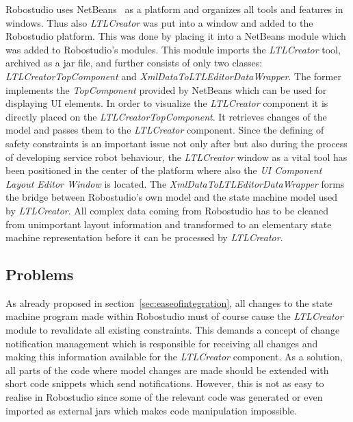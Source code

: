 Robostudio uses NetBeans~\cite{netbeans} as a platform and organizes all tools and features in windows. Thus also \emph{LTLCreator} was put into a window and added to the Robostudio platform. This was done by placing it into a NetBeans module which was added to Robostudio's modules. This module imports the \emph{LTLCreator} tool, archived as a jar file, and further consists of only two classes: \emph{LTLCreatorTopComponent} and \emph{XmlDataToLTLEditorDataWrapper}. The former implements the \emph{TopComponent} provided by NetBeans which can be used for displaying UI elements. In order to visualize the \emph{LTLCreator} component it is directly placed on the \emph{LTLCreatorTopComponent}. It retrieves changes of the model and passes them to the \emph{LTLCreator} component. Since the defining of safety constraints is an important issue not only after but also during the process of developing service robot behaviour, the \emph{LTLCreator} window as a vital tool has been positioned in the center of the platform where also the \emph{UI Component Layout Editor Window} is located.
The \emph{XmlDataToLTLEditorDataWrapper} forms the bridge between Robostudio's own model and the state machine model used by \emph{LTLCreator}. All complex data coming from Robostudio has to be cleaned from unimportant layout information and transformed to an elementary state machine representation before it can be processed by \emph{LTLCreator}.






\subsection{Problems}

As already proposed in section~\ref{sec:easeofintegration}, all changes to the state machine program made within Robostudio must of course cause the \emph{LTLCreator} module to revalidate all existing constraints. This demands a concept of change notification management which is responsible for receiving all changes and making this information available for the \emph{LTLCreator} component. As a solution, all parts of the code where model changes are made should be extended with short code snippets which send notifications.
However, this is not as easy to realise in Robostudio since some of the relevant code was generated or even imported as external jars which makes code manipulation impossible.

